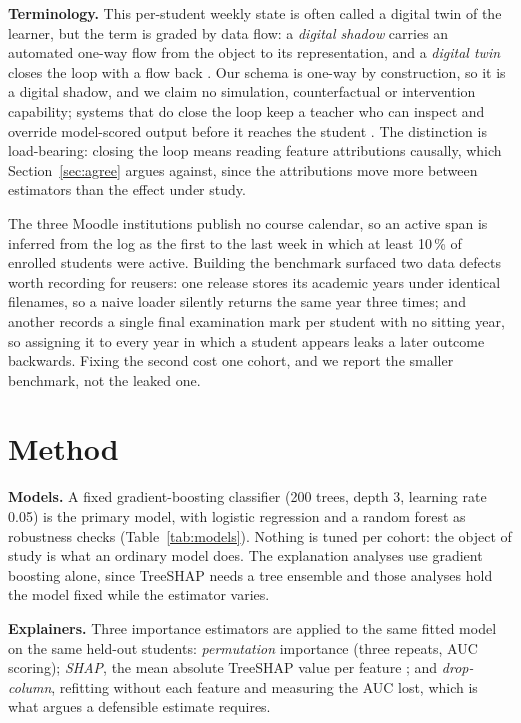 \documentclass[conference]{IEEEtran}
\begin{document}
\textbf{Terminology.} This per-student weekly state is often called a digital
twin of the learner, but the term is graded by data flow: a \emph{digital
shadow} carries an automated one-way flow from the object to its representation,
and a \emph{digital twin} closes the loop with a flow back
\cite{kritzinger2018,addanki2023}. Our schema is one-way by construction, so it
is a digital shadow, and we claim no simulation, counterfactual or intervention
capability; systems that do close the loop keep a teacher who can inspect and
override model-scored output before it reaches the student
\cite{yerniyazov2026}. The distinction is load-bearing: closing the loop means
reading feature attributions causally, which Section~\ref{sec:agree} argues
against, since the attributions move more between estimators than the effect
under study.

The three Moodle institutions publish no course calendar, so an active span is
inferred from the log as the first to the last week in which at least 10\,\% of
enrolled students were active. Building the benchmark surfaced two data defects
worth recording for reusers: one release stores its academic years under
identical filenames, so a naive loader silently returns the same year three
times; and another records a single final examination mark per student with no
sitting year, so assigning it to every year in which a student appears leaks a
later outcome backwards. Fixing the second cost one cohort, and we report the
smaller benchmark, not the leaked one.

\section{Method}

\textbf{Models.} A fixed gradient-boosting classifier \cite{friedman2001} (200
trees, depth 3, learning rate 0.05) is the primary model, with logistic
regression and a random forest as robustness checks (Table~\ref{tab:models}).
Nothing is tuned per cohort: the object of study is what an ordinary model does.
The explanation analyses use gradient boosting alone, since TreeSHAP needs a
tree ensemble and those analyses hold the model fixed while the
estimator varies.

\textbf{Explainers.} Three importance estimators are applied to the same fitted
model on the same held-out students: \emph{permutation} importance (three
repeats, AUC scoring); \emph{SHAP}, the mean absolute TreeSHAP value per feature
\cite{lundberg2017}; and \emph{drop-column}, refitting without each feature and
measuring the AUC lost, which is what \cite{hooker2021} argues a defensible
estimate requires.
\end{document}
